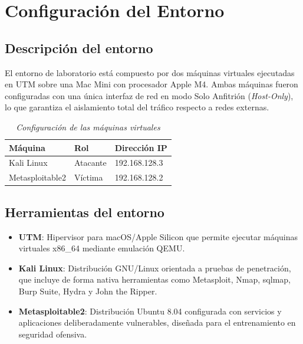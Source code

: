 \documentclass[12pt, letterpaper]{article}
\begin{document}
\section{Configuración del Entorno}

\subsection{Descripción del entorno}

El entorno de laboratorio está compuesto por dos máquinas virtuales ejecutadas en UTM sobre una Mac Mini con procesador Apple M4. Ambas máquinas fueron configuradas con una única interfaz de red en modo Solo Anfitrión (\textit{Host-Only}), lo que garantiza el aislamiento total del tráfico respecto a redes externas.

\begin{table}[H]
  \centering
  \caption{\textit{Configuración de las máquinas virtuales}}
  \begin{tabular}{@{}lll@{}}
    \toprule
    \textbf{Máquina} & \textbf{Rol} & \textbf{Dirección IP} \\
    \midrule
    Kali Linux        & Atacante     & 192.168.128.3 \\
    Metasploitable2   & Víctima      & 192.168.128.2 \\
    \bottomrule
  \end{tabular}
\end{table}

\subsection{Herramientas del entorno}

\begin{itemize}
  \item \textbf{UTM}: Hipervisor para macOS/Apple Silicon que permite ejecutar máquinas virtuales x86\_64 mediante emulación QEMU.
  \item \textbf{Kali Linux}: Distribución GNU/Linux orientada a pruebas de penetración, que incluye de forma nativa herramientas como Metasploit, Nmap, sqlmap, Burp Suite, Hydra y John the Ripper.
  \item \textbf{Metasploitable2}: Distribución Ubuntu 8.04 configurada con servicios y aplicaciones deliberadamente vulnerables, diseñada para el entrenamiento en seguridad ofensiva.
\end{itemize}
\end{document}

